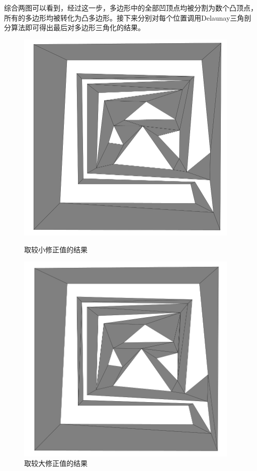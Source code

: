 综合两图可以看到，经过这一步，多边形中的全部凹顶点均被分割为数个凸顶点，所有的多边形均被转化为凸多边形。接下来分别对每个位置调用Delaunay三角剖分算法即可得出最后对多边形三角化的结果。
\begin{figure}[htbp]
    \centering
    \begin{minipage}{0.4\textwidth}
        \centering
        \includegraphics[width=0.95\textwidth]
        {figures/output2.png}
        \caption{取较小修正值的结果}
        \label{small}
    \end{minipage}
    \begin{minipage}{0.4\textwidth}
        \centering
        \includegraphics[width=0.95\textwidth]
        {figures/output1.png}
        \caption{取较大修正值的结果}
        \label{large}
    \end{minipage}
\end{figure}

